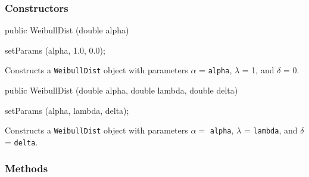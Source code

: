 \subsubsection* {Constructors}

\begin{code}

   public WeibullDist (double alpha)\begin{hide} {
      setParams (alpha, 1.0, 0.0);
   }\end{hide}
\end{code}
 \begin{tabb} Constructs a \texttt{WeibullDist} object with parameters
    $\alpha$ = \texttt{alpha}, $\lambda$ = 1, and $\delta$ = 0.
 \end{tabb}
\begin{code}

   public WeibullDist (double alpha, double lambda, double delta)\begin{hide} {
      setParams (alpha, lambda, delta);
   }\end{hide}
\end{code}
\begin{tabb} Constructs a \texttt{WeibullDist} object with parameters
     $\alpha =$ \texttt{alpha},
     $\lambda $ = \texttt{lambda}, and $\delta$ = \texttt{delta}.
 \end{tabb}

\subsubsection* {Methods}

